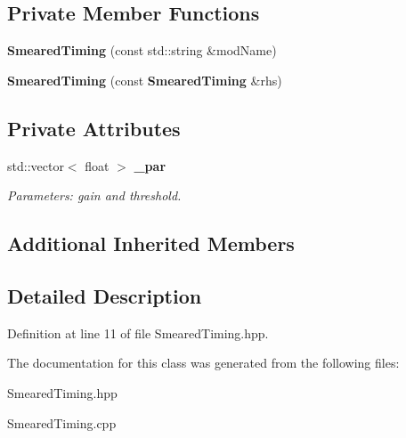 \subsection*{Private Member Functions}
\begin{DoxyCompactItemize}
\item 
{\bfseries Smeared\-Timing} (const std\-::string \&mod\-Name)\label{classdigisim_1_1SmearedTiming_a145f06b6464795163fe3e155a0e61e1c}

\item 
{\bfseries Smeared\-Timing} (const {\bf Smeared\-Timing} \&rhs)\label{classdigisim_1_1SmearedTiming_a642b9104cc973966ef4a7a16761cdb9d}

\end{DoxyCompactItemize}
\subsection*{Private Attributes}
\begin{DoxyCompactItemize}
\item 
std\-::vector$<$ float $>$ {\bf \-\_\-par}\label{classdigisim_1_1SmearedTiming_ae561a940d1502fd5194184320ca9d8a4}

\begin{DoxyCompactList}\small\item\em Parameters\-: gain and threshold. \end{DoxyCompactList}\end{DoxyCompactItemize}
\subsection*{Additional Inherited Members}


\subsection{Detailed Description}


Definition at line 11 of file Smeared\-Timing.\-hpp.



The documentation for this class was generated from the following files\-:\begin{DoxyCompactItemize}
\item 
Smeared\-Timing.\-hpp\item 
Smeared\-Timing.\-cpp\end{DoxyCompactItemize}
